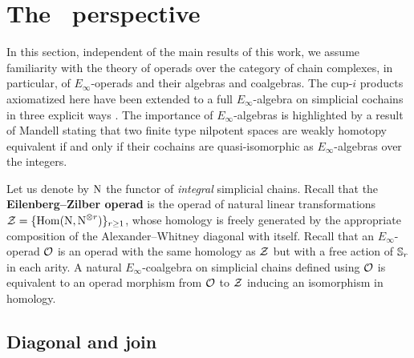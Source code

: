 
\section{The \pdfEinfty\ perspective}\label{s:operads}

In this section, independent of the main results of this work, we assume familiarity with the theory of operads over the category of chain complexes, in particular, of $E_\infty$-operads and their algebras and coalgebras.
The cup-$i$ products axiomatized here have been extended to a full $E_\infty$-algebra on simplicial cochains in three explicit ways \cite{mcclure2003multivariable,berger2004combinatorial,medina2020prop1}.
The importance of $E_\infty$-algebras is highlighted by a result of Mandell \cite{mandell2006homotopy_type} stating that two finite type nilpotent spaces are weakly homotopy equivalent if and only if their cochains are quasi-isomorphic as $E_\infty$-algebras over the integers.

Let us denote by $\operatorname{N}$ the functor of \textit{integral} simplicial chains.
Recall that the \textbf{Eilenberg--Zilber operad} is the operad of natural linear transformations $\mathcal{Z} = \{\mathrm{Hom}(\operatorname{N}, \operatorname{N}^{\otimes r})\}_{r\geq1}$, whose homology is freely generated by the appropriate composition of the Alexander--Whitney diagonal with itself.
Recall that an $E_\infty$-operad $\mathcal{O}$ is an operad with the same homology as $\mathcal{Z}$ but with a free action of $\mathbb{S}_r$ in each arity.
A natural $E_\infty$-coalgebra on simplicial chains defined using $\mathcal{O}$ is equivalent to an operad morphism from $\mathcal{O}$ to $\mathcal{Z}$ inducing an isomorphism in homology.


\subsection{Diagonal and join}

